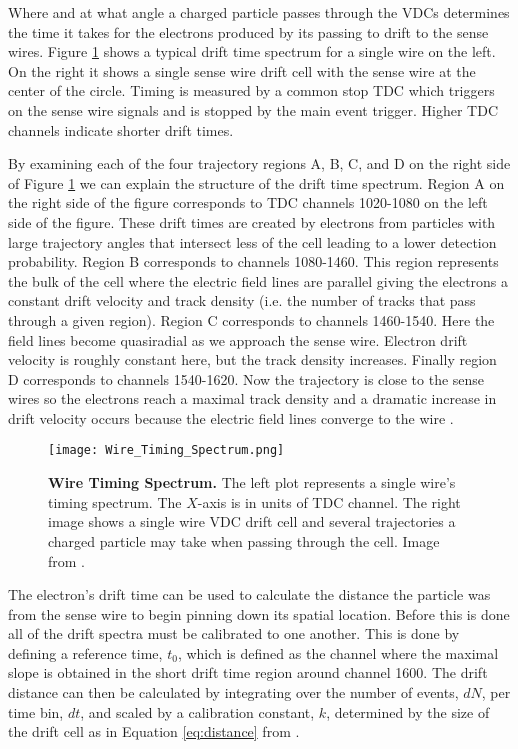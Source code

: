 Where and at what angle a charged particle passes through the VDCs determines the time it takes for the electrons produced by its passing to drift to the sense wires. Figure \ref{fig:drift} shows a typical drift time spectrum for a single wire on the left. On the right it shows a single sense wire drift cell with the sense wire at the center of the circle. Timing is measured by a common stop TDC which triggers on the sense wire signals and is stopped by the main event trigger. Higher TDC channels indicate shorter drift times.

By examining each of the four trajectory regions A, B, C, and D on the right side of Figure \ref{fig:drift} we can explain the structure of the drift time spectrum. Region A on the right side of the figure corresponds to TDC channels 1020-1080 on the left side of the figure. These drift times are created by electrons from particles with large trajectory angles that intersect less of the cell leading to a lower detection probability. Region B corresponds to channels 1080-1460. This region represents the bulk of the cell where the electric field lines are parallel giving the electrons a constant drift velocity and track density (i.e. the number of tracks that pass through a given region). Region C corresponds to channels 1460-1540. Here the field lines become quasiradial as we approach the sense wire. Electron drift velocity is roughly constant here, but the track density increases. Finally region D corresponds to channels 1540-1620. Now the trajectory is close to the sense wires so the electrons reach a maximal track density and a dramatic increase in drift velocity occurs because the electric field lines converge to the wire \cite{Article:VDCs}.

\begin{figure}[!ht]
\begin{center}
\texttt{[image: Wire\_Timing\_Spectrum.png]}
\end{center}
\caption[Wire Timing Spectrum]{
{\bf{Wire Timing Spectrum.}} The left plot represents a single wire's timing spectrum. The $X$-axis is in units of TDC channel. The right image shows a single wire VDC drift cell and several trajectories a charged particle may take when passing through the cell. Image from \cite{Article:VDCs}.}
\label{fig:drift}
\end{figure}

The electron's drift time can be used to calculate the distance the particle was from the sense wire to begin pinning down its spatial location. Before this is done all of the drift spectra must be calibrated to one another. This is done by defining a reference time, $t_0$, which is defined as the channel where the maximal slope is obtained in the short drift time region around channel 1600. The drift distance can then be calculated by integrating over the number of events, $dN$, per time bin, $dt$, and scaled by a calibration constant, $k$, determined by the size of the drift cell as in Equation \ref{eq:distance} from \cite{Article:VDCs}.

